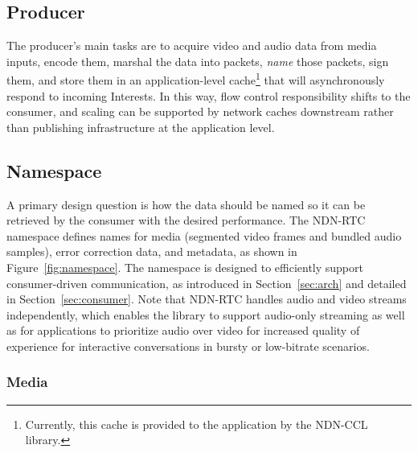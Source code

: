 \documentclass{icn/sig-alternate-2013} %
\newcommand{\ndnrtcName}{NDN-RTC} %
\begin{document}

\subsection{Producer}
The producer's main tasks are to acquire video and audio data from media inputs, encode them, marshal the data into packets, \textit{name} those packets, sign them, and store them in an application-level cache\footnote{Currently, this cache is provided to the application by the NDN-CCL library.} that will asynchronously respond to incoming Interests. In this way, flow control responsibility shifts to the consumer, and scaling can be supported by network caches downstream rather than publishing infrastructure at the application level.  

\subsection{Namespace}

A primary design question is how the data should be named so it can be retrieved by the consumer with the desired performance. The \ndnrtcName{} namespace defines names for media (segmented video frames and bundled audio samples), error correction data, and metadata, as shown in Figure~\ref{fig:namespace}.  The namespace is designed to efficiently support consumer-driven communication, as introduced in Section~\ref{sec:arch} and detailed in Section~\ref{sec:consumer}. Note that \ndnrtcName{} handles audio and video streams independently, which enables the library to support audio-only streaming as well as for applications to prioritize audio over video for increased quality of experience for interactive conversations in bursty or low-bitrate scenarios.  

\subsubsection{Media} 
\end{document}
